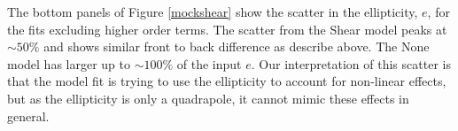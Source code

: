 The bottom panels of Figure \ref{mockshear} show the scatter in the ellipticity, $e$, for the fits excluding higher order terms. The scatter from the Shear model peaks at $\sim 50\%$ and shows similar front to back difference as describe above. The None model has larger up to $\sim 100\%$ of the input $e$. Our interpretation of this scatter is that the model fit is trying to use the ellipticity to account for non-linear effects, but as the ellipticity is only a quadrapole, it cannot mimic these effects in general.